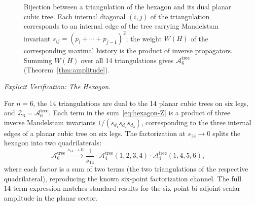 \documentclass[11pt]{article}
\theoremstyle{plain}
\theoremstyle{definition}
\theoremstyle{remark}
\begin{document}
\begin{figure}[H]
\centering
{}
\caption{Bijection between a triangulation of the hexagon and its dual
planar cubic tree. Each internal diagonal $(i,j)$ of the triangulation
corresponds to an internal edge of the tree carrying Mandelstam invariant
$s_{ij}=(p_i+\cdots+p_{j-1})^2$; the weight $W(H)$ of the corresponding
maximal history is the product of inverse propagators. Summing $W(H)$
over all 14 triangulations gives $\mathcal{A}_6^{\mathrm{tree}}$
(Theorem~\ref{thm:amplitude}).}
\end{figure}

\medskip\noindent\textit{Explicit Verification: The Hexagon.}

For $n = 6$, the 14 triangulations are dual to the 14 planar cubic trees
on six legs, and $\mathcal{Z}_6 = \mathcal{A}_6^{\mathrm{tree}}$. Each
term in the sum~\eqref{eq:hexagon-Z} is a product of three inverse
Mandelstam invariants $1/(s_{d_1} s_{d_2} s_{d_3})$, corresponding to the
three internal edges of a planar cubic tree on six legs. The factorization
at $s_{14} \to 0$ splits the hexagon into two quadrilaterals:
\[
  \mathcal{A}_6^{\mathrm{tree}} \xrightarrow{s_{14} \to 0}
  \frac{1}{s_{14}} \cdot \mathcal{A}_4^{\mathrm{tree}}(1,2,3,4)
  \cdot \mathcal{A}_4^{\mathrm{tree}}(1,4,5,6),
\]
where each factor is a sum of two terms (the two triangulations of the
respective quadrilateral), reproducing the known six-point factorization
channel. The full 14-term expression matches standard results for the
six-point bi-adjoint scalar amplitude in the planar sector.
\end{document}
